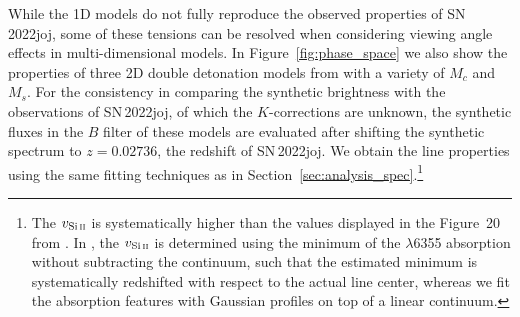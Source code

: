 \documentclass[twocolumn]{aastex631}
\newcommand{\sn}{SN\,2022joj}
\begin{document}
\begin{CJK*}{UTF8}{gbsn}
While the 1D models do not fully reproduce the observed properties of \sn, some of these tensions can be resolved when considering viewing angle effects in multi-dimensional models. In Figure~\ref{fig:phase_space} we also show the properties of three 2D double detonation models from \citet{Shen_2D_2021} with a variety of $M_c$ and $M_s$. For the consistency in comparing the synthetic brightness with the observations of \sn, of which the $K$-corrections are unknown, the synthetic fluxes in the $B$ filter of these models are evaluated after shifting the synthetic spectrum to $z=0.02736$, the redshift of \sn. We obtain the  line properties using the same fitting techniques as in Section~\ref{sec:analysis_spec}.\footnote{The $v_\mathrm{Si\,\textsc{ii}}$ is systematically higher than the values displayed in the Figure~20 from \citet{Shen_2D_2021}. In \citet{Shen_2D_2021}, the $v_\mathrm{Si\,\textsc{ii}}$ is determined using the minimum of the  $\lambda$6355 absorption without subtracting the continuum, such that the estimated minimum is systematically redshifted with respect to the actual line center, whereas we fit the absorption features with Gaussian profiles on top of a linear continuum.}  

\end{CJK*}
\end{document}
